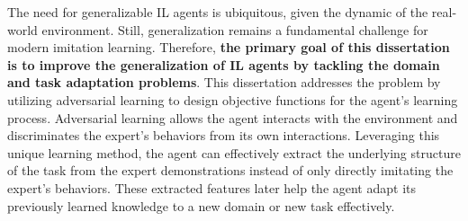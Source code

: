 The need for generalizable IL agents is ubiquitous,
given the dynamic of the real-world environment.
Still,
generalization remains a fundamental challenge for modern imitation learning.
Therefore,
\textbf{the primary goal of this dissertation is to improve the generalization of IL agents by tackling the domain and task adaptation problems}.
This dissertation addresses the problem by utilizing adversarial learning to design objective functions for the agent's learning process.
Adversarial learning allows the agent interacts with the environment and discriminates the expert's behaviors from its own interactions.
Leveraging this unique learning method,
the agent can effectively extract the underlying structure of the task from the expert demonstrations instead of only directly imitating the expert's behaviors.
These extracted features later help the agent adapt its previously learned knowledge to a new domain or new task effectively.
